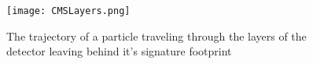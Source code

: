 \begin{figure}
	\centering
	\texttt{[image: CMSLayers.png]}
	\caption[Particle trajectories and footprint in CMS]{The trajectory of a particle traveling through the layers of the detector leaving behind it's signature footprint\label{CMSLayers}}
\end{figure}



